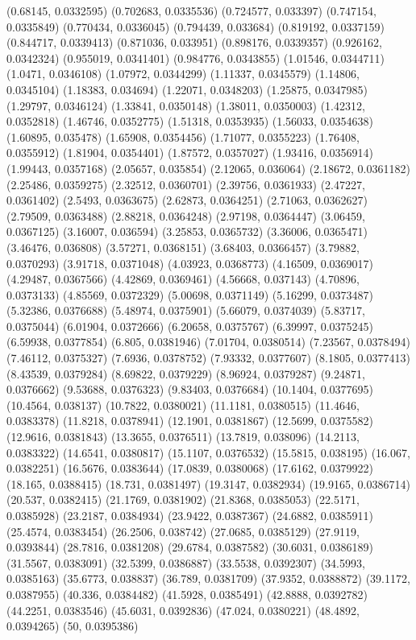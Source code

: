 {(0.68145, 0.0332595)
(0.702683, 0.0335536)
(0.724577, 0.033397)
(0.747154, 0.0335849)
(0.770434, 0.0336045)
(0.794439, 0.033684)
(0.819192, 0.0337159)
(0.844717, 0.0339413)
(0.871036, 0.033951)
(0.898176, 0.0339357)
(0.926162, 0.0342324)
(0.955019, 0.0341401)
(0.984776, 0.0343855)
(1.01546, 0.0344711)
(1.0471, 0.0346108)
(1.07972, 0.0344299)
(1.11337, 0.0345579)
(1.14806, 0.0345104)
(1.18383, 0.034694)
(1.22071, 0.0348203)
(1.25875, 0.0347985)
(1.29797, 0.0346124)
(1.33841, 0.0350148)
(1.38011, 0.0350003)
(1.42312, 0.0352818)
(1.46746, 0.0352775)
(1.51318, 0.0353935)
(1.56033, 0.0354638)
(1.60895, 0.035478)
(1.65908, 0.0354456)
(1.71077, 0.0355223)
(1.76408, 0.0355912)
(1.81904, 0.0354401)
(1.87572, 0.0357027)
(1.93416, 0.0356914)
(1.99443, 0.0357168)
(2.05657, 0.035854)
(2.12065, 0.036064)
(2.18672, 0.0361182)
(2.25486, 0.0359275)
(2.32512, 0.0360701)
(2.39756, 0.0361933)
(2.47227, 0.0361402)
(2.5493, 0.0363675)
(2.62873, 0.0364251)
(2.71063, 0.0362627)
(2.79509, 0.0363488)
(2.88218, 0.0364248)
(2.97198, 0.0364447)
(3.06459, 0.0367125)
(3.16007, 0.036594)
(3.25853, 0.0365732)
(3.36006, 0.0365471)
(3.46476, 0.036808)
(3.57271, 0.0368151)
(3.68403, 0.0366457)
(3.79882, 0.0370293)
(3.91718, 0.0371048)
(4.03923, 0.0368773)
(4.16509, 0.0369017)
(4.29487, 0.0367566)
(4.42869, 0.0369461)
(4.56668, 0.037143)
(4.70896, 0.0373133)
(4.85569, 0.0372329)
(5.00698, 0.0371149)
(5.16299, 0.0373487)
(5.32386, 0.0376688)
(5.48974, 0.0375901)
(5.66079, 0.0374039)
(5.83717, 0.0375044)
(6.01904, 0.0372666)
(6.20658, 0.0375767)
(6.39997, 0.0375245)
(6.59938, 0.0377854)
(6.805, 0.0381946)
(7.01704, 0.0380514)
(7.23567, 0.0378494)
(7.46112, 0.0375327)
(7.6936, 0.0378752)
(7.93332, 0.0377607)
(8.1805, 0.0377413)
(8.43539, 0.0379284)
(8.69822, 0.0379229)
(8.96924, 0.0379287)
(9.24871, 0.0376662)
(9.53688, 0.0376323)
(9.83403, 0.0376684)
(10.1404, 0.0377695)
(10.4564, 0.038137)
(10.7822, 0.0380021)
(11.1181, 0.0380515)
(11.4646, 0.0383378)
(11.8218, 0.0378941)
(12.1901, 0.0381867)
(12.5699, 0.0375582)
(12.9616, 0.0381843)
(13.3655, 0.0376511)
(13.7819, 0.038096)
(14.2113, 0.0383322)
(14.6541, 0.0380817)
(15.1107, 0.0376532)
(15.5815, 0.038195)
(16.067, 0.0382251)
(16.5676, 0.0383644)
(17.0839, 0.0380068)
(17.6162, 0.0379922)
(18.165, 0.0388415)
(18.731, 0.0381497)
(19.3147, 0.0382934)
(19.9165, 0.0386714)
(20.537, 0.0382415)
(21.1769, 0.0381902)
(21.8368, 0.0385053)
(22.5171, 0.0385928)
(23.2187, 0.0384934)
(23.9422, 0.0387367)
(24.6882, 0.0385911)
(25.4574, 0.0383454)
(26.2506, 0.038742)
(27.0685, 0.0385129)
(27.9119, 0.0393844)
(28.7816, 0.0381208)
(29.6784, 0.0387582)
(30.6031, 0.0386189)
(31.5567, 0.0383091)
(32.5399, 0.0386887)
(33.5538, 0.0392307)
(34.5993, 0.0385163)
(35.6773, 0.038837)
(36.789, 0.0381709)
(37.9352, 0.0388872)
(39.1172, 0.0387955)
(40.336, 0.0384482)
(41.5928, 0.0385491)
(42.8888, 0.0392782)
(44.2251, 0.0383546)
(45.6031, 0.0392836)
(47.024, 0.0380221)
(48.4892, 0.0394265)
(50, 0.0395386)
}

